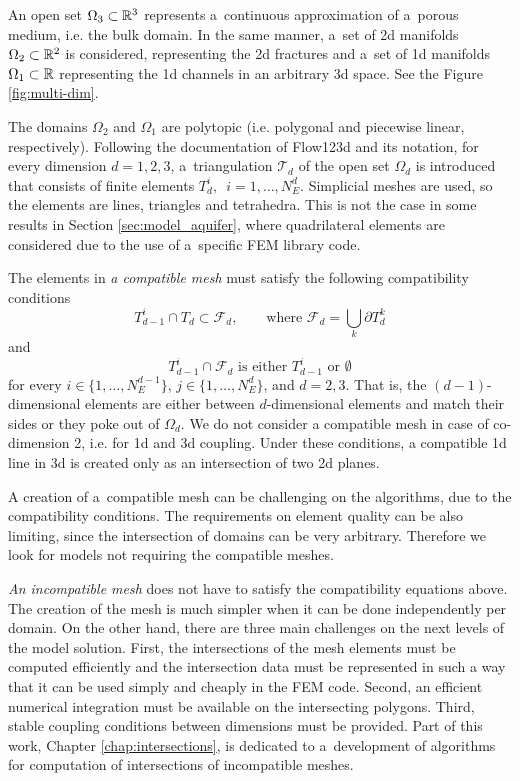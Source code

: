 An open set $\Omega_{3} \subset {\mathbb{R}}^3$ represents a~continuous approximation of a~porous medium, i.e. the bulk domain.
In the same manner, a~set of 2d manifolds $\Omega_2 \subset {\mathbb{R}}^2$ is considered, representing the 2d fractures
and a~set of 1d manifolds $\Omega_1 \subset {\mathbb{R}}$ representing the 1d channels in an arbitrary 3d space.
See the Figure \ref{fig:multi-dim}.


The domains $\Omega_2$ and $\Omega_1$ are polytopic (i.e. polygonal and piecewise linear, respectively).
Following the documentation of Flow123d \cite{flow123d_doc_2015} and its notation,
for every dimension $d=1,2,3$, a~triangulation $\mathcal{T}_{d}$ of the open set $\Omega_d$
is introduced that consists of finite elements $T_{d}^{i},$\ $i = 1,\dots,N_{E}^{d}$.
Simplicial meshes are used, so the elements are lines, triangles and tetrahedra.
This is not the case in some results in Section \ref{sec:model_aquifer}, where quadrilateral elements are considered
due to the use of a~specific FEM library code.


The elements in \emph{a compatible mesh} must satisfy the following compatibility conditions
\begin{equation}
        T_{d-1}^i \cap T_d \subset \mathcal{F}_d,   \qquad \text{where } \mathcal{F}_d = \bigcup_{k} \partial T_{d}^{k}
\end{equation}
and
\begin{equation}
        T_{d-1}^i \cap \mathcal{F}_d    \text{ is either $T_{d-1}^i$ or $\emptyset$}    
\end{equation}
for every $i\in\{1,\dots, N_{E}^{d-1}\}$, $j\in\{1,\dots,N_{E}^{d}\}$,  and $d=2,3$. 
That is, the $(d-1)$-dimensional elements are either between $d$-dimensional elements and
match their sides or they poke out of $\Omega_d$. 
We do not consider a compatible mesh in case of co-dimension 2, i.e. for 1d and 3d coupling.
Under these conditions, a compatible 1d line in 3d is created only as an intersection of 
two 2d planes.

A creation of a~compatible mesh can be challenging on the algorithms, due to the compatibility conditions.
The requirements on element quality can be also limiting, since the intersection of domains can be very arbitrary.
Therefore we look for models not requiring the compatible meshes.

\emph{An incompatible mesh} does not have to satisfy the compatibility equations above.
The creation of the mesh is much simpler when it can be done independently per domain.
On the other hand, there are three main challenges on the next levels of the model solution.
First, the intersections of the mesh elements must be computed efficiently and the intersection data
must be represented in such a way that it can be used simply and cheaply in the FEM code.
Second, an efficient numerical integration must be available on the intersecting polygons.
Third, stable coupling conditions between dimensions must be provided.
Part of this work, Chapter \ref{chap:intersections}, is dedicated to a~development of algorithms
for computation of intersections of incompatible meshes.



